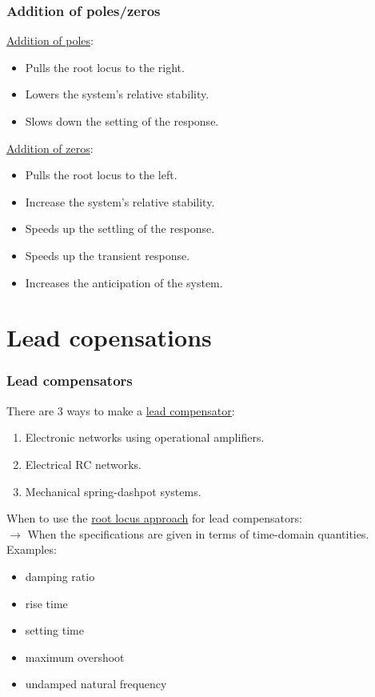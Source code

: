 \begin{frame}
	\frametitle{Addition of poles/zeros}
	\underline{Addition of poles}:\\
	\begin{itemize}
		\item Pulls the root locus to the right.
		\item Lowers the system's relative stability.
		\item Slows down the setting of the response.
	\end{itemize}
	\vspace{3mm}
	
	\underline{Addition of zeros}:
	\begin{itemize}
		\item Pulls the root locus to the left.
		\item Increase the system's relative stability.
		\item Speeds up the settling of the response.
		\item Speeds up the transient response.
		\item Increases the anticipation of the system. 
	\end{itemize}
\end{frame}

\section{Lead copensations}

\begin{frame}
	\frametitle{Lead compensators}
		There are 3 ways to make a \underline{lead compensator}:
		\begin{enumerate}
			\item Electronic networks using operational amplifiers.
			\item Electrical RC networks.
			\item Mechanical spring-dashpot systems.
		\end{enumerate}
		\vspace{3mm}
		
		When to use the \underline{root locus approach} for lead compensators:\\
		$\rightarrow$ When the specifications are given in terms of time-domain quantities. Examples:
		\begin{itemize}
			\item damping ratio
			\item rise time
			\item setting time
			\item maximum overshoot
			\item undamped natural frequency
		\end{itemize}
\end{frame}

